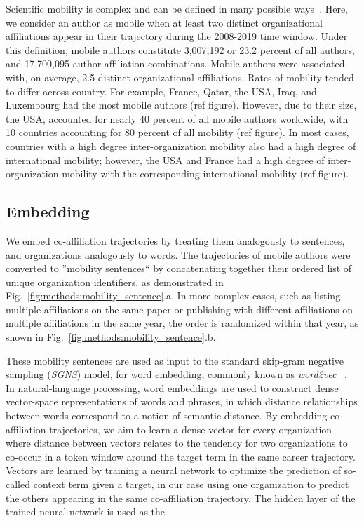 \documentclass[12pt]{article} %
\def\SGNS{\textit{SGNS}}
\begin{document}
Scientific mobility is complex and can be defined in many possible ways~\autocite{robinson2019mobility}.
Here, we consider an author as mobile when at least two distinct organizational affiliations appear in their trajectory during the 2008-2019 time window. 
Under this definition, mobile authors constitute 3,007,192 or 23.2 percent of all authors, and 17,700,095 author-affiliation combinations. 
Mobile authors were associated with, on average, 2.5 distinct organizational affiliations. 
Rates of mobility tended to differ across country. 
For example, France, Qatar, the USA, Iraq, and Luxembourg had the most mobile authors (ref figure).
However, due to their size, the USA, accounted for nearly 40 percent of all mobile authors worldwide, with  10 countries accounting for 80 percent of all mobility (ref figure).
In most cases, countries with a high degree inter-organization mobility also had a high degree of international mobility;
however, the USA and France had a high degree of inter-organization mobility with the corresponding international mobility (ref figure). 


\subsection*{Embedding}
We embed co-affiliation trajectories by treating them analogously to sentences, and organizations analogously to words. 
The trajectories of mobile authors were converted to ''mobility sentences`` by concatenating together their ordered list of unique organization identifiers, as demonstrated in Fig.~\ref{fig:methods:mobility_sentence}.a.
In more complex cases, such as listing multiple affiliations on the same paper or publishing with different affiliations on multiple affiliations in the same year, the order is randomized within that year, as shown in  Fig.~\ref{fig:methods:mobility_sentence}.b. 

These mobility sentences are used as input to the standard skip-gram negative sampling (\SGNS) model, for word embedding, commonly known as \textit{word2vec}~\autocite{mikolov2013word2vec} . 
In natural-language processing, word embeddings are used to construct dense vector-space representations of words and phrases, in which distance relationships between words correspond to a notion of semantic distance. 
By embedding co-affiliation trajectories, we aim to learn a dense vector for every organization where distance between vectors relates to the tendency for two organizations to co-occur in a token window around the target term in the same career trajectory. 
Vectors are learned by training a neural network to optimize the prediction of so-called context term given a target, in our case using one organization to predict the others appearing in the same co-affiliation trajectory. 
The hidden layer of the trained neural network is used as the 
\end{document}
